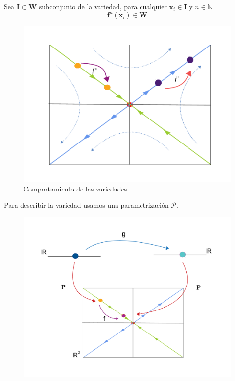 \documentclass[11pt]{beamer}
\theoremstyle{definition}
\begin{document}
\begin{frame}
Sea  $\mathbf{I} \subset \mathbf{W}$ subconjunto de la variedad, para cualquier $\mathbf{x}_{i}\in  \mathbf{I}$  y $ n\in\mathbb{N}$ 
\begin{equation}
\mathbf{f}^{n}(\mathbf{x}_{i}) \in \mathbf{W}
\end{equation}
\begin{figure}
\includegraphics[scale=0.43]{hyperbolic2A.pdf}
\caption{Comportamiento de las variedades.}
\end{figure}
\end{frame}
\begin{frame}
Para describir la variedad usamos una parametrizaci\'on $\mathcal{P}$.
\begin{figure}
\includegraphics[scale=0.35]{diagrama-c2.pdf}
\end{figure}
\end{frame}
\end{document}
